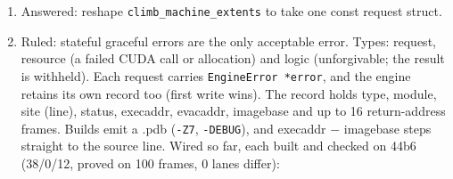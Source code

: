 \begin{enumerate}
\item Answered: reshape \texttt{climb\_\allowbreak{}machine\_\allowbreak{}extents} to take one const request struct.
\item Ruled: stateful graceful errors are the only acceptable error. Types: request, resource (a failed CUDA call or allocation) and logic (unforgivable; the result is withheld). Each request carries \texttt{Engine\allowbreak{}Error *error}, and the engine retains its own record too (first write wins). The record holds type, module, site (line), status, execaddr, evacaddr, imagebase and up to 16 return-address frames. Builds emit a .pdb (\texttt{-\allowbreak{}Z7}, \texttt{-\allowbreak{}DEBUG}), and execaddr − imagebase steps straight to the source line. Wired so far, each built and checked on 44b6 (38/0/12, proved on 100 frames, 0 lanes differ):
\end{enumerate}

